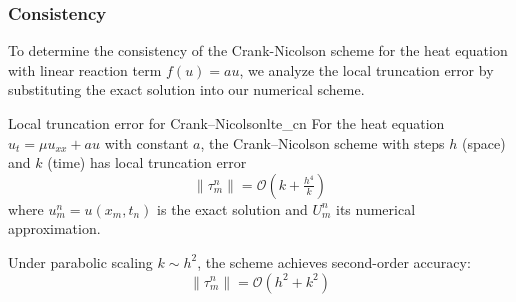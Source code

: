 \subsubsection{Consistency}
To determine the consistency of the Crank-Nicolson scheme for the heat equation with linear reaction term $f(u) = au$, we analyze the local truncation error by substituting the exact solution into our numerical scheme.

\begin{theorem}{Local truncation error for Crank--Nicolson}{lte_cn}
  For the heat equation $u_t = \mu u_{xx} + au$ with constant $a$, the Crank--Nicolson scheme with steps $h$ (space) and $k$ (time) has local truncation error
  \[
    \|\tau_m^n\| = \mathcal{O}\!\left(k +\tfrac{h^4}{k}\right)
  \]
  where $u_m^n = u(x_m,t_n)$ is the exact solution and $U_m^n$ its numerical approximation.

  Under parabolic scaling $k \sim h^2$, the scheme achieves second-order accuracy:
  \[
    \|\tau_m^n\| = \mathcal{O}\!\left(h^2 + k^2\right)
  \]
\end{theorem}

